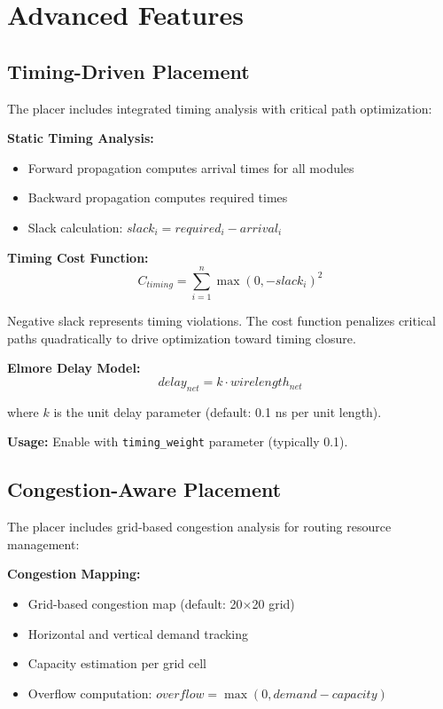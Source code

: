 \documentclass[11pt]{article}
\begin{document}
\section{Advanced Features}

\subsection{Timing-Driven Placement}

The placer includes integrated timing analysis with critical path optimization:

\textbf{Static Timing Analysis:}
\begin{itemize}
    \item Forward propagation computes arrival times for all modules
    \item Backward propagation computes required times
    \item Slack calculation: $slack_i = required_i - arrival_i$
\end{itemize}

\textbf{Timing Cost Function:}
\begin{equation}
C_{timing} = \sum_{i=1}^{n} \max(0, -slack_i)^2
\end{equation}

Negative slack represents timing violations. The cost function penalizes critical paths quadratically to drive optimization toward timing closure.

\textbf{Elmore Delay Model:}
\begin{equation}
delay_{net} = k \cdot wirelength_{net}
\end{equation}

where $k$ is the unit delay parameter (default: 0.1 ns per unit length).

\textbf{Usage:} Enable with \texttt{timing\_weight} parameter (typically 0.1).

\subsection{Congestion-Aware Placement}

The placer includes grid-based congestion analysis for routing resource management:

\textbf{Congestion Mapping:}
\begin{itemize}
    \item Grid-based congestion map (default: 20$\times$20 grid)
    \item Horizontal and vertical demand tracking
    \item Capacity estimation per grid cell
    \item Overflow computation: $overflow = \max(0, demand - capacity)$
\end{itemize}
\end{document}
